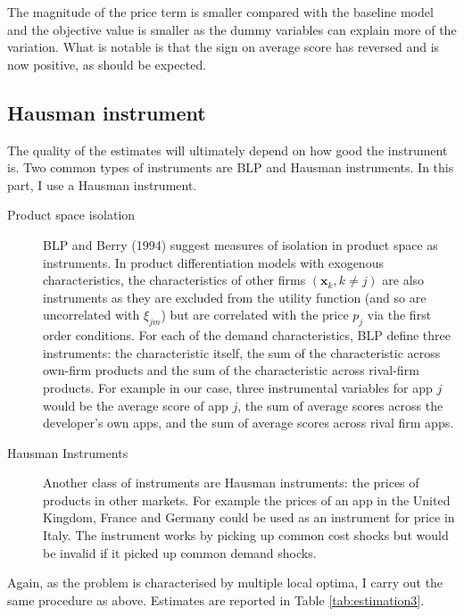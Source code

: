 \documentclass[parskip=half]{scrartcl}
\begin{document}
The magnitude of the price term is smaller compared with the baseline model and the objective value is smaller as the dummy variables can explain more of the variation. What is notable is that the sign on average score has reversed and is now positive, as should be expected.



\subsection{Hausman instrument}

The quality of the estimates will ultimately depend on how good the instrument is. Two common types of instruments are BLP and Hausman instruments. In this part, I use a Hausman instrument.

\begin{description}
	\item[Product space isolation] BLP and Berry (1994) suggest measures of isolation in product space as instruments. 
	In product differentiation models with exogenous characteristics, the characteristics of other firms $(\boldsymbol{x}_k, k \neq j)$ are also instruments as they are excluded from the utility function (and so are uncorrelated with $\xi_{jm}$) but are correlated with the price $p_j$ via the first order conditions.
	For each of the demand characteristics, BLP define three instruments: the characteristic itself, the sum of the characteristic across own-firm products and the sum of the characteristic across rival-firm products. For example in our case, three instrumental variables for app $j$ would be the average score of app $j$, the sum of average scores across the developer's own apps, and the sum of average scores across rival firm apps.
	
	\item[Hausman Instruments] Another class of instruments are Hausman instruments: the prices of products in other markets. For example the prices of an app in the United Kingdom, France and Germany could be used as an instrument for price in Italy. The instrument works by picking up common cost shocks but would be invalid if it picked up common demand shocks.
\end{description}

Again, as the problem is characterised by multiple local optima, I carry out the same procedure as above. Estimates are reported in Table \ref{tab:estimation3}.


\end{document}
